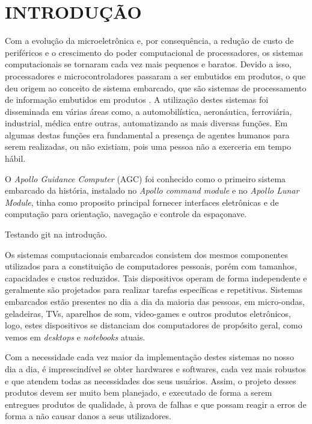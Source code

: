 
\chapter{INTRODUÇÃO}
\label{chap:introducao}
Com a evolução da microeletrônica e, por consequência, a redução de custo de periféricos e o crescimento do poder computacional de processadores, os sistemas computacionais se tornaram cada vez mais pequenos e baratos. Devido a isso, processadores e microcontroladores passaram a ser embutidos em produtos, o que deu origem ao conceito de sistema embarcado, que são sistemas de processamento de informação embutidos em produtos \cite{Marwedel2006}.
A utilização destes sistemas foi disseminada em várias áreas como, a automobilística, aeronáutica, ferroviária, industrial, médica entre outras, automatizando as mais diversas funções. Em algumas destas funções era fundamental a presença de agentes humanos para serem realizadas, ou não existiam, pois uma pessoa não a exerceria em tempo hábil.

O \textit{Apollo Guidance Computer} (AGC) foi conhecido como o primeiro sistema embarcado da história, instalado no \textit{Apollo command module} e no \textit{Apollo Lunar Module}, tinha como proposito principal fornecer interfaces eletrônicas e de computação para orientação, navegação e controle da espaçonave.

Testando git na introdução.

Os sistemas computacionais embarcados consistem dos mesmos componentes utilizados para a constituição de computadores pessoais, porém com tamanhos, capacidades e custos reduzidos. Tais dispositivos operam de forma independente e geralmente são projetados para realizar tarefas específicas e repetitivas. 
Sistemas embarcados estão presentes no dia a dia da maioria das pessoas, em micro-ondas, geladeiras, TVs, aparelhos de som, video-games e outros produtos eletrônicos\cite{Marwedel2006}, logo, estes dispositivos se distanciam dos computadores de propósito geral, como vemos em \textit{desktops} e \textit{notebooks} atuais. 




Com a necessidade cada vez maior da implementação destes sistemas no nosso dia a dia, é imprescindível se obter hardwares e softwares, cada vez mais robustos e que atendem todas as necessidades dos seus usuários.
Assim, o projeto desses produtos devem ser muito bem planejado, e executado de forma a serem entregues produtos de qualidade, à  prova de falhas e que possam reagir a erros de forma a não causar danos a seus utilizadores. 

